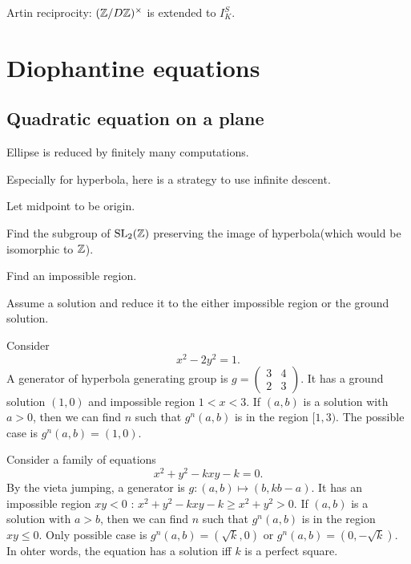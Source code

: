 \documentclass[11pt]{article}
\let\realsection\section
\renewcommand\section{\newpage\realsection}
\begin{document}
Artin reciprocity: $(\mathbb{Z}/D\mathbb{Z})^\times$ is extended to $I_K^S$.







\section{Diophantine equations}

\subsection{Quadratic equation on a plane}
Ellipse is reduced by finitely many computations.


Especially for hyperbola, here is a strategy to use infinite descent.
\begin{cond}
\item Let midpoint to be origin.
\item Find the subgroup of $\mathrm{SL}_2(\mathbb{Z})$ preserving the image of hyperbola(which would be isomorphic to $\mathbb{Z}$).
\item Find an impossible region.
\item Assume a solution and reduce it to the either impossible region or the ground solution.
\end{cond}
\begin{ex}
Consider\[x^2-2y^2=1.\]
A generator of hyperbola generating group is $g=\begin{pmatrix}3&4\\2&3\end{pmatrix}$.
It has a ground solution $(1,0)$ and impossible region $1<x<3$.
If $(a,b)$ is a solution with $a>0$, then we can find $n$ such that $g^n(a,b)$ is in the region $[1,3)$.
The possible case is $g^n(a,b)=(1,0)$.
\end{ex}
\begin{ex}
Consider a family of equations\[x^2+y^2-kxy-k=0.\]
By the vieta jumping, a generator is $g:(a,b)\mapsto(b,kb-a)$.
It has an impossible region $xy<0$ : $x^2+y^2-kxy-k\ge x^2+y^2>0$.
If $(a,b)$ is a solution with $a>b$, then we can find $n$ such that $g^n(a,b)$ is in the region $xy\le0$.
Only possible case is $g^n(a,b)=(\sqrt k,0)$ or $g^n(a,b)=(0,-\sqrt k)$.
In ohter words, the equation has a solution iff $k$ is a perfect square.
\end{ex}


\clearpage
\end{document}
